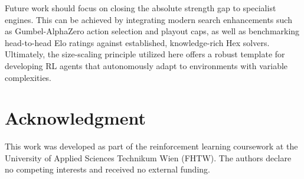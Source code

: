 \documentclass[conference]{IEEEtran}
\begin{document}
Future work should focus on closing the absolute strength gap to specialist engines. This can be achieved by integrating modern search enhancements such as Gumbel-AlphaZero action selection and playout caps, as well as benchmarking head-to-head Elo ratings against established, knowledge-rich Hex solvers. Ultimately, the size-scaling principle utilized here offers a robust template for developing RL agents that autonomously adapt to environments with variable complexities.

\section*{Acknowledgment}
This work was developed as part of the reinforcement learning coursework at the University
of Applied Sciences Technikum Wien (FHTW). The authors declare no competing interests and
received no external funding.

\FloatBarrier
\end{document}
